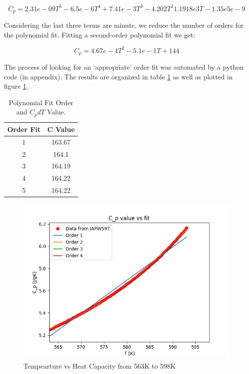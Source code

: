 \documentclass[12pt,letterpaper]{article}
\begin{document}
\[C_p = 2.31e-09 T^5 -6.5e-6 T^4 +7.41e-3 T^3 -4.202 T^2 1.1918e3 T -1.35e5e-9\]

Considering the last three terms are minute, we reduce the 
number of orders for the polynomial fit. Fitting a second-order
polynomial fit we get:

\[C_p = 4.67e-4T^2 -5.1e-1T + 144\]

The process of looking for an `appropriate' order fit was automated
by a python code (in appendix). The results are organized in table \ref{tab:poly_fit} as well as plotted in figure \ref{fig:poly_fit}.


\begin{table}[h]
     \centering
    \begin{tabular}{cc}
       \hline
       Order Fit & C Value  \\
       \hline
       1 & 163.67 \\
       2 & 164.1 \\
       3 & 164.19 \\
       4 & 164.22 \\
       5 & 164.22 \\
       \hline
    \end{tabular}
    \caption {Polynomial Fit Order and $C_p dT$ Value.}
    \label{tab:poly_fit}
\end{table}


\begin{figure}[htbp!]
    \begin{center}
        \includegraphics[scale=0.7]{cp_plot.png}
    \end{center}
    \caption{Tempearture vs Heat Capacity from 563K to 598K}
    \label{fig:poly_fit}
\end{figure}
\end{document}
